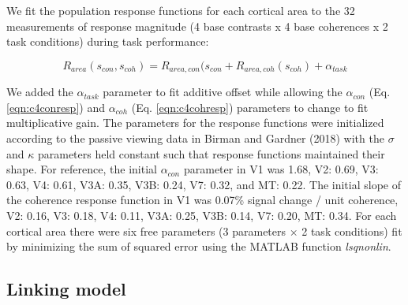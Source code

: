 \documentclass{report}
\begin{document}
We fit the population response functions for each cortical area to the 32 measurements of response magnitude (4 base contrasts x 4 base coherences x 2 task conditions) during task performance:

\begin{equation}
    R_{area}(s_{con},s_{coh})=R_{area,con}(s_{con}+R_{area,coh}(s_{coh})+\alpha_{task}
    \label{eqn:c4r_area}
\end{equation}

We added the $\alpha_{task}$ parameter to fit additive offset while allowing the $\alpha_{con}$ (Eq. \ref{eqn:c4conresp}) and $\alpha_{coh}$ (Eq. \ref{eqn:c4cohresp}) parameters to change to fit multiplicative gain. The parameters for the response functions were initialized according to the passive viewing data in Birman and Gardner (2018) with the $\sigma$ and $\kappa$ parameters held constant such that response functions maintained their shape. For reference, the initial $\alpha_{con}$ parameter in V1 was 1.68, V2: 0.69, V3: 0.63, V4: 0.61, V3A: 0.35, V3B: 0.24, V7: 0.32, and MT: 0.22. The initial slope of the coherence response function in V1 was 0.07\% signal change / unit coherence, V2: 0.16, V3: 0.18, V4: 0.11, V3A: 0.25, V3B: 0.14, V7: 0.20, MT: 0.34. For each cortical area there were six free parameters (3 parameters $\times$ 2 task conditions) fit by minimizing the sum of squared error using the MATLAB function \textit{lsqnonlin}.   

\subsection{Linking model}
\end{document}
